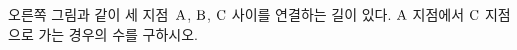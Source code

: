 \hspace*{2mm}\begin{minipage}[t]{\dimexpr\linewidth-2mm\relax}\vspace{0pt}
\noindent\begin{minipage}[t]{0.58\linewidth}\vspace{0pt}\raggedright 오른쪽 그림과 같이 세 지점~$\mathrm{A}$, $\mathrm{B}$, $\mathrm{C}$ 사이를 연결하는 길이 있다. $\mathrm{A}$ 지점에서 $\mathrm{C}$ 지점으로 가는 경우의 수를 구하시오. \end{minipage}\hfill\begin{minipage}[t]{0.4\linewidth}\vspace{0pt}\centering \resizebox{\ifdim\width>\linewidth\linewidth\else\width\fi}{!}{}\end{minipage}\par\end{minipage}
